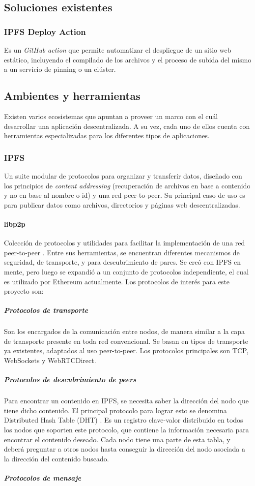 \subsection{Soluciones existentes}

\subsubsection{IPFS Deploy Action}

Es un \textit{GitHub action} que permite automatizar el despliegue de un sitio web estático, incluyendo el compilado de los archivos y el proceso de subida del mismo a un servicio de pinning o un clúster.

\subsection{Ambientes y herramientas}
Existen varios ecosistemas que apuntan a proveer un marco con el cuál desarrollar una aplicación descentralizada. A su vez, cada uno de ellos cuenta con herramientas especializadas para los diferentes tipos de aplicaciones.

\subsubsection{IPFS}
Un suite modular de protocolos para organizar y transferir datos, diseñado con los principios de \textit{content addressing} (recuperación de archivos en base a contenido y no en base al nombre o id) y una red peer-to-peer. Su principal caso de uso es para publicar datos como archivos, directorios y páginas web descentralizadas.\cite{ipfs}

\paragraph{libp2p} Colección de protocolos y utilidades para facilitar la implementación de una red peer-to-peer \cite{libp2p}. Entre sus herramientas, se encuentran diferentes mecanismos de seguridad, de transporte, y para descubrimiento de pares. Se creó con IPFS en mente, pero luego se expandió a un conjunto de protocolos independiente, el cual es utilizado por Ethereum actualmente. Los protocolos de interés para este proyecto son:
\subparagraph{Protocolos de transporte} Son los encargados de la comunicación entre nodos, de manera similar a la capa de transporte presente en toda red convencional. Se basan en tipos de transporte ya existentes, adaptados al uso peer-to-peer. Los protocolos principales son TCP, WebSockets y WebRTCDirect.
\subparagraph{Protocolos de descubrimiento de peers} Para encontrar un contenido en IPFS, se necesita saber la dirección del nodo que tiene dicho contenido. El principal protocolo para lograr esto se denomina Distributed Hash Table (DHT) \cite{dht}. Es un registro clave-valor distribuido en todos los nodos que soporten este protocolo, que contiene la información necesaria para encontrar el contenido deseado. Cada nodo tiene una parte de esta tabla, y deberá preguntar a otros nodos hasta conseguir la dirección del nodo asociada a la dirección del contenido buscado.
\subparagraph{Protocolos de mensaje}

